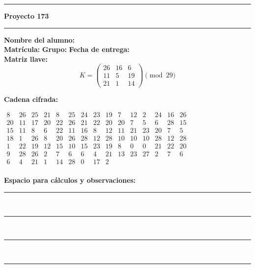 \documentclass{article}%
\begin{document}
\bigskip
\hrule
\bigskip%

\textbf{Proyecto 173}\\[2pt]
\hrule
\bigskip

\textbf{Nombre del alumno:} \underline{\hspace{8cm}}\\[8pt]
\textbf{Matrícula:} \underline{\hspace{4cm}} \hspace{1cm}
\textbf{Grupo:} \underline{\hspace{2cm}} \hspace{1cm}
\textbf{Fecha de entrega:} \underline{\hspace{2.5cm}}\\[12pt]

\textbf{Matriz llave:}
\[
K = \begin{pmatrix}
26 & 16 & 6 \\
11 & 5 & 19 \\
21 & 1 & 14
\end{pmatrix} \pmod{29}
\]

\textbf{Cadena cifrada:}
\begin{center}
$\begin{array}{lllllllllllllll}
8 & 26 & 25 & 21 & 8 & 25 & 24 & 23 & 19 & 7 & 12 & 2 & 24 & 16 & 26\\
20 & 11 & 17 & 20 & 22 & 26 & 21 & 22 & 20 & 20 & 7 & 5 & 6 & 28 & 15\\
15 & 11 & 8 & 6 & 22 & 11 & 16 & 8 & 12 & 11 & 21 & 23 & 20 & 7 & 5\\
18 & 1 & 26 & 8 & 20 & 26 & 28 & 12 & 28 & 10 & 10 & 10 & 28 & 12 & 28\\
1 & 22 & 19 & 12 & 15 & 10 & 15 & 23 & 19 & 8 & 0 & 0 & 21 & 22 & 20\\
9 & 28 & 26 & 2 & 7 & 6 & 6 & 4 & 21 & 13 & 23 & 27 & 2 & 7 & 6\\
6 & 4 & 21 & 1 & 14 & 28 & 0 & 17 & 2\\
\end{array}$
\end{center}

\bigskip
\textbf{Espacio para cálculos y observaciones:}\\[6pt]
\rule{\linewidth}{0.4pt}\\[10pt]
\rule{\linewidth}{0.4pt}\\[10pt]
\rule{\linewidth}{0.4pt}\\[10pt]
\rule{\linewidth}{0.4pt}\\[10pt]
%
\end{document}
